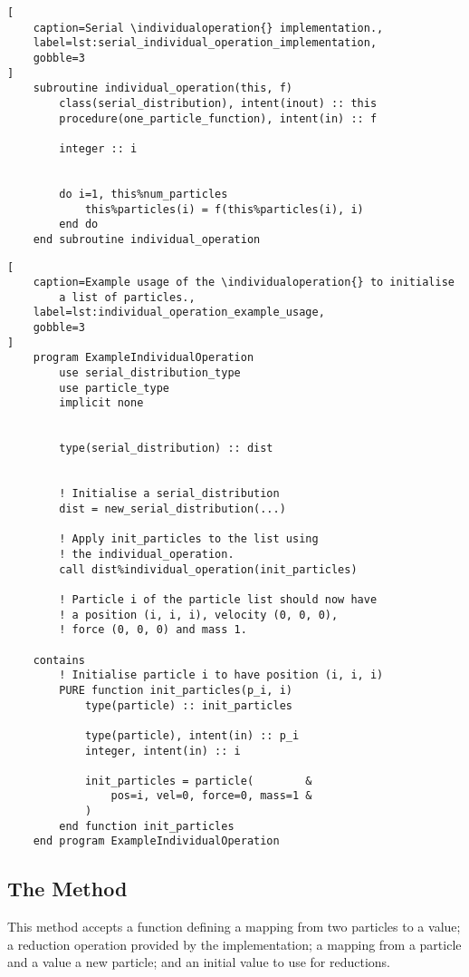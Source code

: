 \begin{lstlisting}[
    caption=Serial \individualoperation{} implementation.,
    label=lst:serial_individual_operation_implementation,
    gobble=3
]
    subroutine individual_operation(this, f)
        class(serial_distribution), intent(inout) :: this
        procedure(one_particle_function), intent(in) :: f

        integer :: i


        do i=1, this%num_particles
            this%particles(i) = f(this%particles(i), i)
        end do
    end subroutine individual_operation
\end{lstlisting}

\begin{lstlisting}[
    caption=Example usage of the \individualoperation{} to initialise
        a list of particles.,
    label=lst:individual_operation_example_usage,
    gobble=3
]
    program ExampleIndividualOperation
        use serial_distribution_type
        use particle_type
        implicit none


        type(serial_distribution) :: dist

    
        ! Initialise a serial_distribution
        dist = new_serial_distribution(...)

        ! Apply init_particles to the list using
        ! the individual_operation.
        call dist%individual_operation(init_particles)

        ! Particle i of the particle list should now have
        ! a position (i, i, i), velocity (0, 0, 0),
        ! force (0, 0, 0) and mass 1.

    contains
        ! Initialise particle i to have position (i, i, i)
        PURE function init_particles(p_i, i)
            type(particle) :: init_particles

            type(particle), intent(in) :: p_i
            integer, intent(in) :: i

            init_particles = particle(        &
                pos=i, vel=0, force=0, mass=1 &
            )
        end function init_particles
    end program ExampleIndividualOperation
\end{lstlisting}


\subsection{The \pairoperation{} Method}
\label{sec:the_pair_operation_method}

This method accepts
a function defining a mapping from two particles to a value;
a reduction operation provided by the implementation;
a mapping from a particle and a value a new particle;
and an initial value to use for reductions.

